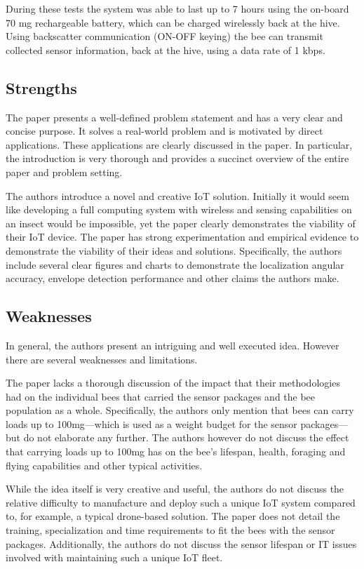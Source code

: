 \documentclass[letterpaper,twocolumn,10pt]{article}
\begin{document}
During these tests the system was able to last up to 7 hours using the on-board 70 mg rechargeable battery, which can be charged wirelessly back at the hive. Using backscatter communication (ON-OFF keying) the bee can transmit collected sensor information, back at the hive, using a data rate of 1 kbps. 

\subsection*{Strengths}

The paper presents a well-defined problem statement and has a very clear and concise purpose. It solves a real-world problem and is motivated by direct applications. These applications are clearly discussed in the paper. In particular, the introduction is very thorough and provides a succinct overview of the entire paper and problem setting.

The authors introduce a novel and creative IoT solution. Initially it would seem like developing a full computing system with wireless and sensing capabilities on an insect would be impossible, yet the paper clearly demonstrates the viability of their IoT device. The paper has strong experimentation and empirical evidence to demonstrate the viability of their ideas and solutions. Specifically, the authors include several clear figures and charts to demonstrate the localization angular accuracy, envelope detection performance and other claims the authors make.

\subsection*{Weaknesses}

In general, the authors present an intriguing and well executed idea. However there are several weaknesses and limitations.

The paper lacks a thorough discussion of the impact that their methodologies had on the individual bees that carried the sensor packages and the bee population as a whole. Specifically, the authors only mention that bees can carry loads up to 100mg---which is used as a weight budget for the sensor packages---but do not elaborate any further. The authors however do not discuss the effect that carrying loads up to 100mg has on the bee's lifespan, health, foraging and flying capabilities and other typical activities.

While the idea itself is very creative and useful, the authors do not discuss the relative difficulty to manufacture and deploy such a unique IoT system compared to, for example, a typical drone-based solution. The paper does not detail the training, specialization and time requirements to fit the bees with the sensor packages. Additionally, the authors do not discuss the sensor lifespan or IT issues involved with maintaining such a unique IoT fleet.
\end{document}
